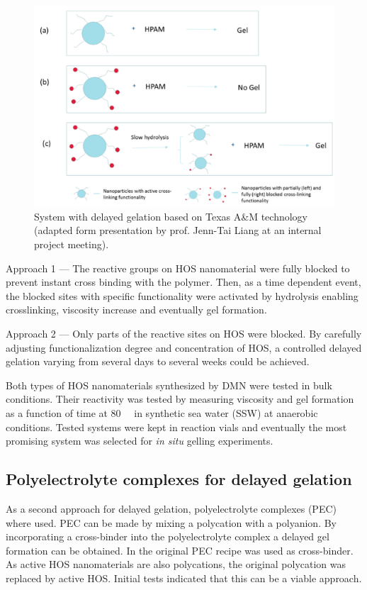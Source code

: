 \documentclass[nanomaterials,article,submit,moreauthors,pdftex]{Definitions/mdpi}
\begin{document}
\begin{figure}[h!]
    \centering
    \includegraphics[width=.5\textwidth]{fig/twoApproaches.png}
    \caption{System with delayed gelation based on Texas A\&M technology \citep{Cordova2008} (adapted form presentation by prof. Jenn-Tai Liang at an internal project meeting).}
    \label{fig:twoApproaches}
\end{figure}
    
    Approach 1 --- The reactive groups on HOS nanomaterial were fully blocked to prevent instant cross binding with the polymer. Then, as a time dependent event, the blocked sites with specific functionality were activated by hydrolysis enabling crosslinking, viscosity increase and eventually gel formation. 
    
    Approach 2 --- Only parts of the reactive sites on HOS were blocked. By carefully adjusting functionalization degree and concentration of HOS, a controlled delayed gelation varying from several days to several weeks could be achieved. 
    
Both types of HOS nanomaterials synthesized by DMN were tested in bulk conditions. Their reactivity was tested by measuring viscosity and gel formation as a function of time at 80~\celsius~ in synthetic sea water (SSW) at anaerobic conditions. Tested systems were kept in reaction vials and eventually the most promising system  was selected for \textit{in situ} gelling experiments.
    
\subsection{Polyelectrolyte complexes for delayed gelation}
As a second approach for delayed gelation, polyelectrolyte complexes (PEC) where used. PEC can be made by mixing a polycation with a polyanion. By incorporating a cross-binder into the polyelectrolyte complex a delayed gel formation can be obtained. In the original PEC recipe  was used as cross-binder. As active HOS nanomaterials are also polycations, the original polycation was replaced by active HOS. Initial tests indicated that this can be a viable approach.
\end{document}

